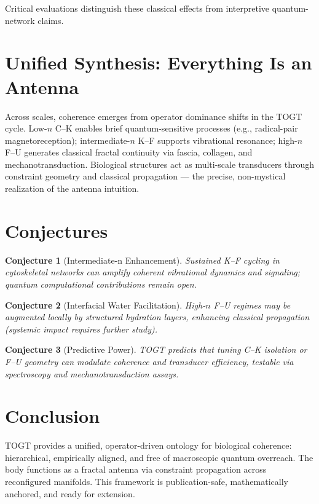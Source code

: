 \documentclass{article}
\newtheorem{conjecture}{Conjecture}
\begin{document}
Critical evaluations distinguish these classical effects from interpretive quantum-network claims.

\section{Unified Synthesis: Everything Is an Antenna}

Across scales, coherence emerges from operator dominance shifts in the TOGT cycle. Low-\(n\) C--K enables brief quantum-sensitive processes (e.g., radical-pair magnetoreception); intermediate-\(n\) K--F supports vibrational resonance; high-\(n\) F--U generates classical fractal continuity via fascia, collagen, and mechanotransduction. Biological structures act as multi-scale transducers through constraint geometry and classical propagation — the precise, non-mystical realization of the antenna intuition.

\section{Conjectures}

\begin{conjecture}[Intermediate-n Enhancement]
Sustained K--F cycling in cytoskeletal networks can amplify coherent vibrational dynamics and signaling; quantum computational contributions remain open.
\end{conjecture}

\begin{conjecture}[Interfacial Water Facilitation]
High-\(n\) F--U regimes may be augmented locally by structured hydration layers, enhancing classical propagation (systemic impact requires further study).
\end{conjecture}

\begin{conjecture}[Predictive Power]
TOGT predicts that tuning C--K isolation or F--U geometry can modulate coherence and transducer efficiency, testable via spectroscopy and mechanotransduction assays.
\end{conjecture}

\section{Conclusion}

TOGT provides a unified, operator-driven ontology for biological coherence: hierarchical, empirically aligned, and free of macroscopic quantum overreach. The body functions as a fractal antenna via constraint propagation across reconfigured manifolds. This framework is publication-safe, mathematically anchored, and ready for extension.
\end{document}
